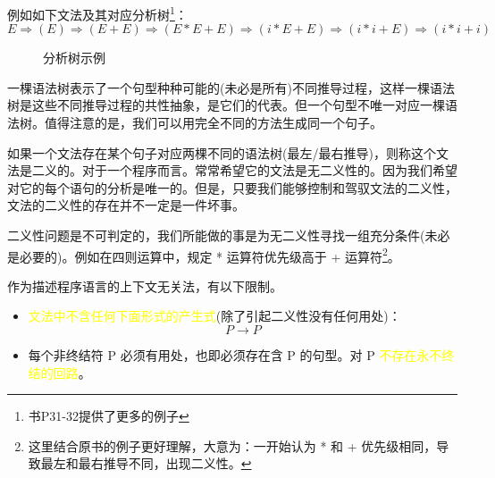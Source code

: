 例如如下文法及其对应分析树\footnote{书P31-32提供了更多的例子}：
\[E \Rightarrow (E) \Rightarrow (E+E) \Rightarrow (E*E+E) \Rightarrow (i*E+E) \Rightarrow (i*i+E) \Rightarrow (i*i+i) \]

\begin{figure}[H]
    \centering
    \caption{分析树示例}
    \label{分析树示例}
\end{figure}

一棵语法树表示了一个句型种种可能的(未必是所有)不同推导过程，这样一棵语法树是这些不同推导过程的共性抽象，是它们的代表。但一个句型不唯一对应一棵语法树。值得注意的是，我们可以用完全不同的方法生成同一个句子。

\textcolor{tip}{如果一个文法存在某个句子对应两棵不同的语法树(最左/最右推导)，则称这个文法是二义的}。对于一个程序而言。常常希望它的文法是无二义性的。因为我们希望对它的每个语句的分析是唯一的。但是，只要我们能够控制和驾驭文法的二义性，\textcolor{tip}{文法的二义性的存在并不一定是一件坏事}。

二义性问题是不可判定的，我们所能做的事是为无二义性寻找一组充分条件(未必是必要的)。例如在四则运算中，规定 * 运算符优先级高于 + 运算符\footnote{这里结合原书的例子更好理解，大意为：一开始认为 * 和 + 优先级相同，导致最左和最右推导不同，出现二义性。}。

作为描述程序语言的上下文无关法，有以下限制。

\begin{itemize}
    \item \textcolor{mark}{文法中不含任何下面形式的产生式}(除了引起二义性没有任何用处)：
          \[P \rightarrow P\]
    \item 每个非终结符 P 必须有用处，也即必须存在含 P 的句型。对 P \textcolor{mark}{不存在永不终结的回路}。
\end{itemize}


